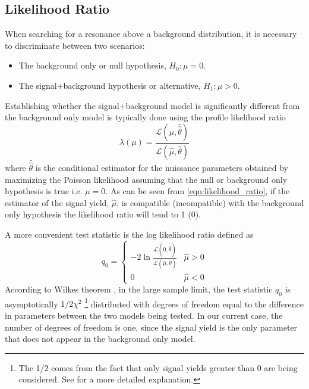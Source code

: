 \subsection{Likelihood Ratio}

When searching for a resonance above a background distribution, it is 
necessary to discriminate between two scenarios:
\begin{itemize}
    \item The background only or null hypothesis, $H_{0}: \mu = 0$.
    \item The signal+background hypothesis or alternative, $H_{1}: \mu > 0$.
\end{itemize}
Establishing whether the signal+background model is significantly different 
from the background only model is typically done using the profile likelihood
ratio
\begin{equation}
    \lambda(\mu) = \frac{\mathcal{L}(\mu, \hat{\hat{\theta}})}{\mathcal{L}(\hat{\mu}, \hat{\theta})}
    \label{eqn:likelihood_ratio}
\end{equation}
where $\hat{\hat{\theta}}$ is the conditional estimator for the nuissance parameters 
obtained by maximizing the Poisson likelihood assuming that the null or 
background only hypothesis is true i.e. $\mu = 0$.
As can be seen from \ref{eqn:likelihood_ratio}, 
if the estimator of the signal yield, $\hat{\mu}$, is compatible (incompatible) with the background
only hypothesis the likelihood ratio will tend to 1 (0).

A more convenient test statistic is the log likelihood ratio defined as
\begin{equation}
    q_0 = \begin{cases}
            -2 \ln \frac{\mathcal{L}(0, \hat{\hat{\theta}})}{\mathcal{L}(\hat{\mu}, \hat{\theta})} 
            & \hat{\mu} > 0 \\
             0  & \hat{\mu} < 0
        \end{cases}
\end{equation}
According to Wilkes theorem \cite{Wilks:1938dza}, in the large sample limit, the test statistic
$q_0$ is asymptotically $1/2\chi^2$ \footnote{The 1/2 comes from the fact that only
signal yields greater than 0 are being considered. See \cite{Cowan:2010js} for a 
more detailed explanation.} distributed with degrees of freedom equal to the
difference in parameters between the two models being tested.  In our current case, 
the number of degrees of freedom is one, since the signal yield is the only 
parameter that does not appear in
the background only model.

